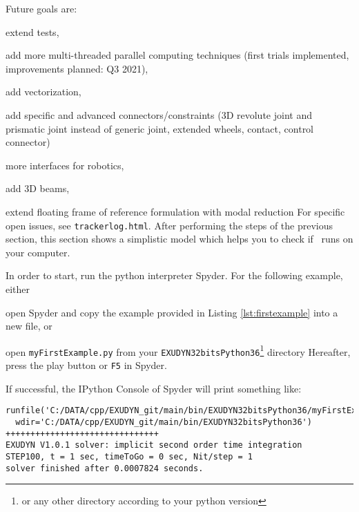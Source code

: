 \ei
Future goals are:
\bi
  \item extend tests,
	\item add more multi-threaded parallel computing techniques (first trials implemented, improvements planned: Q3 2021),
	\item add vectorization,
  \item add specific and advanced connectors/constraints (3D revolute joint and prismatic joint instead of generic joint, extended wheels,
	contact, control connector)
	\item more interfaces for robotics,
	\item add 3D beams,
	\item extend floating frame of reference formulation with modal reduction
\ei
For specific open issues, see \texttt{trackerlog.html}.
%
After performing the steps of the previous section, this section shows a simplistic model which helps you to check if \codeName\ runs on your computer.

In order to start, run the python interpreter Spyder.
For the following example, either 
\bi
	\item open Spyder and copy the example provided in Listing \ref{lst:firstexample} into a new file, or
	\item open \texttt{myFirstExample.py} from your \texttt{EXUDYN32bitsPython36}\footnote{or any other directory according to your python version} directory
\ei
Hereafter, press the play button or \texttt{F5} in Spyder.
%

If successful, the IPython Console of Spyder will print something like:
\plainlststyle
{\ttfamily \footnotesize
\begin{lstlisting}
runfile('C:/DATA/cpp/EXUDYN_git/main/bin/EXUDYN32bitsPython36/myFirstExample.py', 
  wdir='C:/DATA/cpp/EXUDYN_git/main/bin/EXUDYN32bitsPython36')
+++++++++++++++++++++++++++++++
EXUDYN V1.0.1 solver: implicit second order time integration
STEP100, t = 1 sec, timeToGo = 0 sec, Nit/step = 1
solver finished after 0.0007824 seconds.
\end{lstlisting}
}

